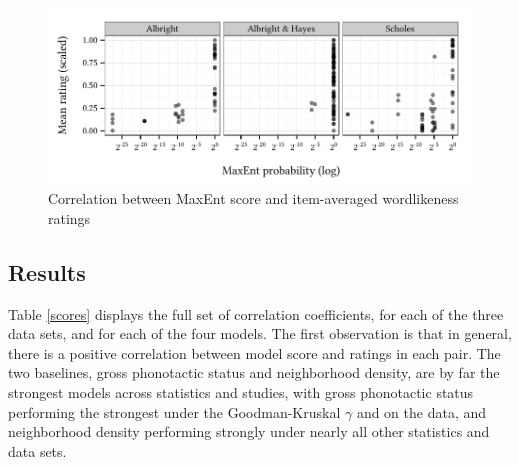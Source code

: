 \begin{figure}[t]
\centering
\includegraphics{maxent.pdf}
\caption{Correlation between MaxEnt score and item-averaged wordlikeness ratings}
\label{maxent}
\end{figure}

\subsection{Results}

Table \ref{scores} displays the full set of correlation coefficients, for each of the three data sets, and for each of the four models. 
The first observation is that in general, there is a positive correlation between model score and ratings in each pair. 
The two baselines, gross phonotactic status and neighborhood density, are by far the strongest models across statistics and studies, with gross phonotactic status performing the strongest under the Goodman-Kruskal $\gamma$ and on the \citet{Albright2007} data, and neighborhood density performing strongly under nearly all other statistics and data sets. 

